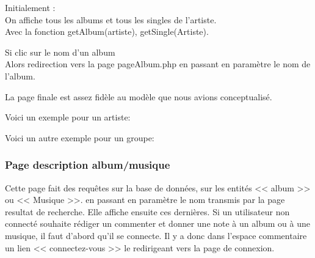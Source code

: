 			\begin{paragraphe}
				Initialement :\\
				On affiche tous les albums et tous les singles de l'artiste.\\
				Avec la fonction getAlbum(artiste), getSingle(Artiste).
			\end{paragraphe}

			\begin{paragraphe}
				Si clic sur le nom d'un album\\
				Alors redirection vers la page pageAlbum.php en passant en paramètre le nom de l'album.
			\end{paragraphe}


            \begin{paragraphe}
                La page finale est assez fidèle au modèle que nous avions conceptualisé.
            \end{paragraphe}

         \newpage

            \begin{paragraphe}
                Voici un exemple pour un artiste:
            \end{paragraphe}

           \begin{paragraphe}
                Voici un autre exemple pour un groupe:
            \end{paragraphe}

        \clearpage

		\subsubsection{Page description album/musique}

			\begin{paragraphe}
                Cette page fait des requêtes sur la base de données, sur les entités << album >> ou << Musique >>.
                 en passant en paramètre le nom transmis par la page resultat de recherche. Elle affiche ensuite ces dernières.
				Si un utilisateur non connecté souhaite rédiger un commenter et donner une note à un album ou à une musique,
				 il faut d'abord qu'il se connecte. Il y a donc dans l'espace commentaire un lien << connectez-vous >> le redirigeant vers la page de connexion.
			\end{paragraphe}

